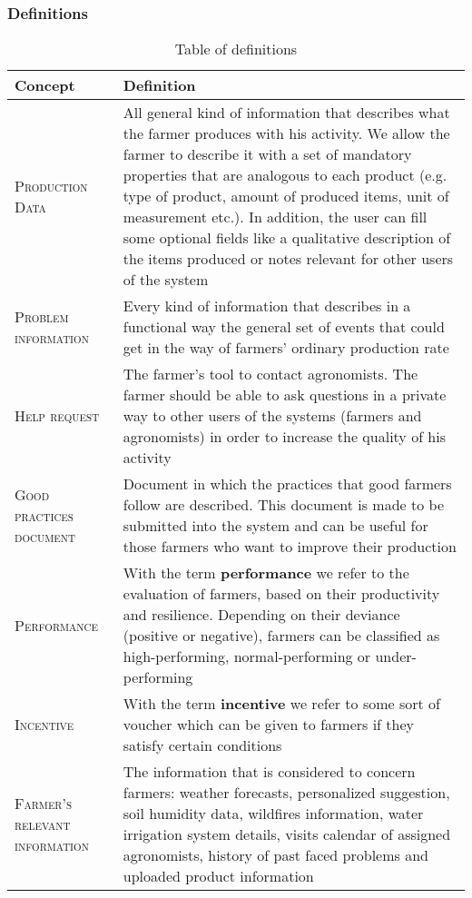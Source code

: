 \subsubsection{Definitions}
\label{sec:definitions}
\begin{table}[H]
    \setlength\arrayrulewidth{1pt}
    \centering
    \begin{tabular}{|m{}|m{}|}
        \rowcolor{myblue}
        \hline
        \color{white}Concept & \color{white}Definition \\
        \hline
        \textsc{Production Data}     &   All general kind of information that describes what the farmer produces with his activity. We allow the farmer to describe it with a set of mandatory properties that are analogous to each product (e.g. type of product, amount of produced items, unit of measurement etc.). In addition, the user can fill some optional fields like a qualitative description of the items produced or notes relevant for other users of the system \\
        \hline
        \textsc{Problem information}  &   Every kind of information that describes in a functional way the general set of events that could get in the way of farmers' ordinary production rate \\
        \hline
        \textsc{Help request}     &   The farmer's tool to contact agronomists. The farmer should be able to ask questions in a private way to other users of the systems (farmers and agronomists) in order to increase the quality of his activity \\
        \hline
        \textsc{\nohyphens{Good  practices document}}     &   Document in which the practices that good farmers follow are described. This document is made to be submitted into the system and can be useful for those farmers who want to improve their production \\
        \hline
        \textsc{Performance}     &   With the term \textbf{performance} we refer to the evaluation of farmers, based on their productivity and resilience. Depending on their deviance (positive or negative), farmers can be classified as high-performing, normal-performing or under-performing \\
        \hline
        \textsc{Incentive}  &   With the term \textbf{incentive} we refer to some sort of voucher which can be given to farmers if they satisfy certain conditions \\
        \hline
        \textsc{Farmer's relevant information}  &   The information that is considered to concern farmers: weather forecasts, personalized suggestion, soil humidity data, wildfires information, water irrigation system details, visits calendar of assigned agronomists, history of past faced problems and uploaded product information \\
        \hline
    \end{tabular}
    
    \caption{\label{tab:def}Table of definitions}
    
\end{table}

